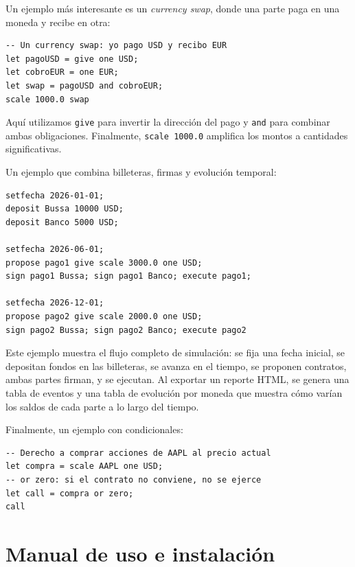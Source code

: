 \documentclass[a4paper, 12pt]{article}
\begin{document}
Un ejemplo más interesante es un \textit{currency swap}, donde una parte paga en una moneda y recibe en otra:

\begin{lstlisting}[style=finstyle, caption={Currency swap (swap.fin)}]
-- Un currency swap: yo pago USD y recibo EUR
let pagoUSD = give one USD;
let cobroEUR = one EUR;
let swap = pagoUSD and cobroEUR;
scale 1000.0 swap
\end{lstlisting}

Aquí utilizamos \texttt{give} para invertir la dirección del pago y \texttt{and} para combinar ambas obligaciones. Finalmente, \texttt{scale 1000.0} amplifica los montos a cantidades significativas.

Un ejemplo que combina billeteras, firmas y evolución temporal:

\begin{lstlisting}[style=finstyle, caption={Evolución temporal con billeteras (graficoTemporal.fin)}]
setfecha 2026-01-01;
deposit Bussa 10000 USD;
deposit Banco 5000 USD;

setfecha 2026-06-01;
propose pago1 give scale 3000.0 one USD;
sign pago1 Bussa; sign pago1 Banco; execute pago1;

setfecha 2026-12-01;
propose pago2 give scale 2000.0 one USD;
sign pago2 Bussa; sign pago2 Banco; execute pago2
\end{lstlisting}

Este ejemplo muestra el flujo completo de simulación: se fija una fecha inicial, se depositan fondos en las billeteras, se avanza en el tiempo, se proponen contratos, ambas partes firman, y se ejecutan. Al exportar un reporte HTML, se genera una tabla de eventos y una tabla de evolución por moneda que muestra cómo varían los saldos de cada parte a lo largo del tiempo.

Finalmente, un ejemplo con condicionales:

\begin{lstlisting}[style=finstyle, caption={Opción call condicional (opcion\_call.fin)}]
-- Derecho a comprar acciones de AAPL al precio actual
let compra = scale AAPL one USD;
-- or zero: si el contrato no conviene, no se ejerce
let call = compra or zero;
call
\end{lstlisting}

\section{Manual de uso e instalación}
\end{document}
